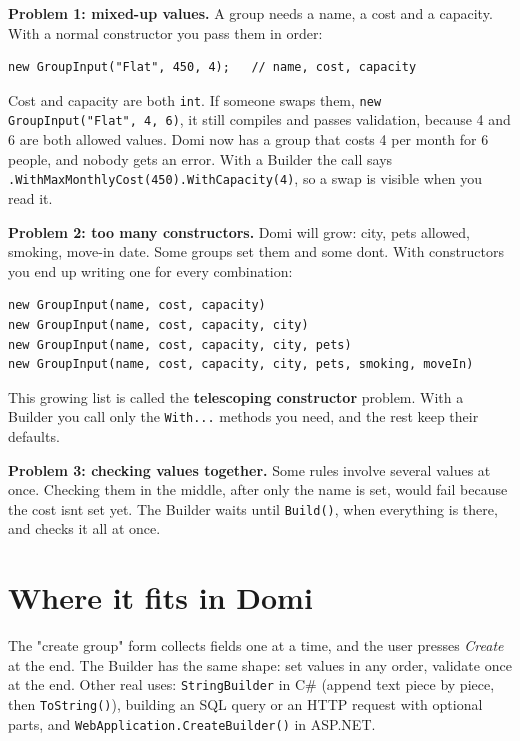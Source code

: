 \documentclass{utmreport}
\providecommand{\passthrough}[1]{#1}
\begin{document}
\textbf{Problem 1: mixed-up values.} A group needs a name, a cost and a capacity. With a normal constructor you pass them in order:

\begin{lstlisting}
new GroupInput("Flat", 450, 4);   // name, cost, capacity
\end{lstlisting}

Cost and capacity are both \passthrough{\lstinline!int!}. If someone swaps them, \passthrough{\lstinline!new GroupInput("Flat", 4, 6)!}, it still compiles and passes validation, because 4 and 6 are both allowed values. Domi now has a group that costs 4 per month for 6 people, and nobody gets an error. With a Builder the call says \passthrough{\lstinline!.WithMaxMonthlyCost(450).WithCapacity(4)!}, so a swap is visible when you read it.

\textbf{Problem 2: too many constructors.} Domi will grow: city, pets allowed, smoking, move-in date. Some groups set them and some don\textquotesingle t. With constructors you end up writing one for every combination:

\begin{lstlisting}
new GroupInput(name, cost, capacity)
new GroupInput(name, cost, capacity, city)
new GroupInput(name, cost, capacity, city, pets)
new GroupInput(name, cost, capacity, city, pets, smoking, moveIn)
\end{lstlisting}

This growing list is called the \textbf{telescoping constructor} problem. With a Builder you call only the \passthrough{\lstinline!With...!} methods you need, and the rest keep their defaults.

\textbf{Problem 3: checking values together.} Some rules involve several values at once. Checking them in the middle, after only the name is set, would fail because the cost isn\textquotesingle t set yet. The Builder waits until \passthrough{\lstinline!Build()!}, when everything is there, and checks it all at once.

\section{Where it fits in Domi}

The "create group" form collects fields one at a time, and the user presses \emph{Create} at the end. The Builder has the same shape: set values in any order, validate once at the end. Other real uses: \passthrough{\lstinline!StringBuilder!} in C\# (append text piece by piece, then \passthrough{\lstinline!ToString()!}), building an SQL query or an HTTP request with optional parts, and \passthrough{\lstinline!WebApplication.CreateBuilder()!} in ASP.NET.
\end{document}
